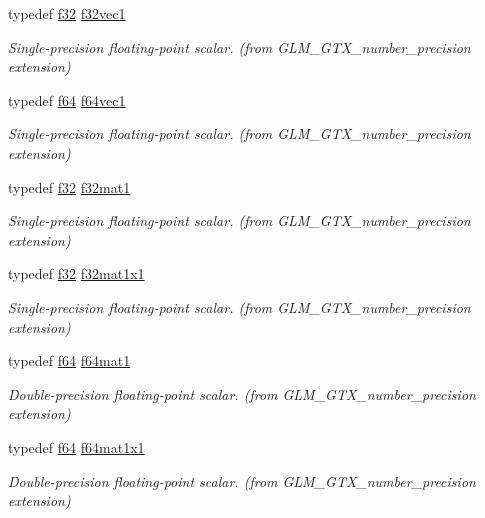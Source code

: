 \begin{DoxyCompactItemize}
typedef \mbox{\hyperlink{group__gtc__type__precision_ga0ec999b57f5330d9021256e96038df04}{f32}} \mbox{\hyperlink{group__gtx__number__precision_gadab8e598b0b4697629482682bdb7f223}{f32vec1}}
\begin{DoxyCompactList}\small\item\em Single-\/precision floating-\/point scalar. (from G\+L\+M\+\_\+\+G\+T\+X\+\_\+number\+\_\+precision extension) \end{DoxyCompactList}\item 
typedef \mbox{\hyperlink{group__gtc__type__precision_ga2bba392e555124b36cde6abba349bab3}{f64}} \mbox{\hyperlink{group__gtx__number__precision_ga44336a26c958d66efdfb5a6c114c538e}{f64vec1}}
\begin{DoxyCompactList}\small\item\em Single-\/precision floating-\/point scalar. (from G\+L\+M\+\_\+\+G\+T\+X\+\_\+number\+\_\+precision extension) \end{DoxyCompactList}\item 
typedef \mbox{\hyperlink{group__gtc__type__precision_ga0ec999b57f5330d9021256e96038df04}{f32}} \mbox{\hyperlink{group__gtx__number__precision_gae5ff376ec910c360f06acc0c2b99260c}{f32mat1}}
\begin{DoxyCompactList}\small\item\em Single-\/precision floating-\/point scalar. (from G\+L\+M\+\_\+\+G\+T\+X\+\_\+number\+\_\+precision extension) \end{DoxyCompactList}\item 
typedef \mbox{\hyperlink{group__gtc__type__precision_ga0ec999b57f5330d9021256e96038df04}{f32}} \mbox{\hyperlink{group__gtx__number__precision_ga01caec78388a82a9a22bd45e5751a38a}{f32mat1x1}}
\begin{DoxyCompactList}\small\item\em Single-\/precision floating-\/point scalar. (from G\+L\+M\+\_\+\+G\+T\+X\+\_\+number\+\_\+precision extension) \end{DoxyCompactList}\item 
typedef \mbox{\hyperlink{group__gtc__type__precision_ga2bba392e555124b36cde6abba349bab3}{f64}} \mbox{\hyperlink{group__gtx__number__precision_ga23f8f53c78b50aa07a113c3d07d01bc9}{f64mat1}}
\begin{DoxyCompactList}\small\item\em Double-\/precision floating-\/point scalar. (from G\+L\+M\+\_\+\+G\+T\+X\+\_\+number\+\_\+precision extension) \end{DoxyCompactList}\item 
typedef \mbox{\hyperlink{group__gtc__type__precision_ga2bba392e555124b36cde6abba349bab3}{f64}} \mbox{\hyperlink{group__gtx__number__precision_ga710a5952d78b22635c71c5fc2c0a3319}{f64mat1x1}}
\begin{DoxyCompactList}\small\item\em Double-\/precision floating-\/point scalar. (from G\+L\+M\+\_\+\+G\+T\+X\+\_\+number\+\_\+precision extension) \end{DoxyCompactList}\end{DoxyCompactItemize}
